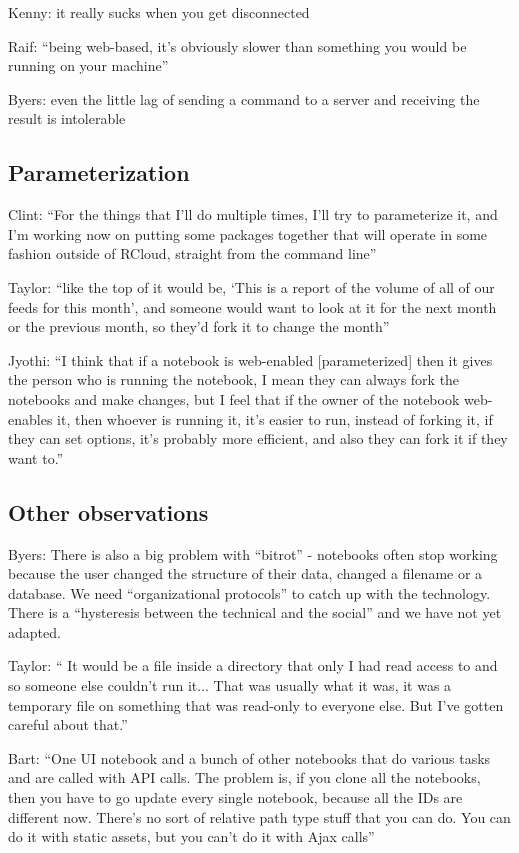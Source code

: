 Kenny: it really sucks when you get disconnected

Raif: ``being web-based, it's obviously slower than something you would be
running on your machine''

Byers: even the little lag of sending a command to a server and receiving the
result is intolerable


\subsection{Parameterization}
Clint: ``For the things that I'll do multiple times, I'll try to parameterize
it, and I'm working now on putting some packages together that will operate in
some fashion outside of RCloud, straight from the command line''

Taylor: ``like the top of it would be, `This is a report of the volume of all of
our feeds for this month', and someone would want to look at it for the next
month or the previous month, so they'd fork it to change the month''

Jyothi: ``I think that if a notebook is web-enabled [parameterized] then it
gives the person who is running the notebook, I mean they can always fork the
notebooks and make changes, but I feel that if the owner of the notebook
web-enables it, then whoever is running it, it's easier to run, instead of
forking it, if they can set options, it's probably more efficient, and also they
can fork it if they want to.''


\subsection{Other observations}
Byers: There is also a big problem with ``bitrot'' - notebooks often stop
working because the user changed the structure of their data, changed a filename
or a database.  We need ``organizational protocols'' to catch up with the
technology.  There is a ``hysteresis between the technical and the social'' and
we have not yet adapted.

Taylor: `` It would be a file inside a directory that only I had read access to
and so someone else couldn't run it... That was usually what it was, it was a
temporary file on something that was read-only to everyone else. But I've gotten
careful about that.''

Bart: ``One UI notebook and a bunch of other notebooks that do various tasks and
are called with API calls. The problem is, if you clone all the notebooks, then
you have to go update every single notebook, because all the IDs are different
now. There's no sort of relative path type stuff that you can do. You can do it
with static assets, but you can't do it with Ajax calls''
